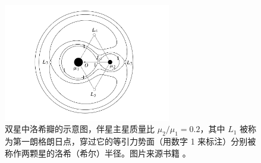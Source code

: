 \begin{figure}[hb!]
\centering
\includegraphics[width=0.65\textwidth]{figures/appendix/f3_rochelimit.pdf}
\caption[双星中洛希瓣的示意图，伴星主星质量比 $\mu_2/\mu_1 = 0.2$，其中 $L_1$ 被称为第一朗格朗日点，穿过它的等引力势面（用数字 1 来标注）分别被称作两颗星的洛希半径。图片版权 C. D. Murray，S. F. Dermott]{双星中洛希瓣的示意图，伴星主星质量比 $\mu_2/\mu_1 = 0.2$，其中 $L_1$ 被称为第一朗格朗日点，穿过它的等引力势面（用数字 1 来标注）分别被称作两颗星的洛希（希尔）半径。图片来源书籍 。}
\label{fig:rocher}
\end{figure}

